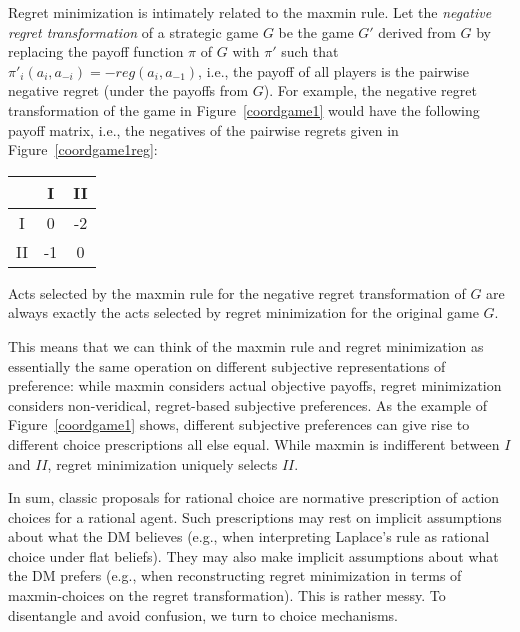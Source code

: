 \documentclass[fleqn,reqno,11pt]{article}
\begin{document}

  

Regret minimization is intimately related to the maxmin rule. Let the \emph{negative regret
  transformation} of a strategic game $G$ be the game $G'$ derived from $G$ by replacing the payoff
function $\pi$ of $G$ with $\pi'$ such that $\pi'_i(a_i, a_{-i}) = - reg(a_i,a_{-1})$, i.e.,
the payoff of all players is the pairwise negative regret (under the payoffs from $G$). For
example, the negative regret transformation of the game in Figure~\ref{coordgame1} would have the
following payoff matrix, i.e., the negatives of the pairwise regrets given in
Figure~\ref{coordgame1reg}:

\begin{center}
    \begin{tabular}{ccc}
      \toprule
      & I & II \\
      \midrule
      I & 0 & -2 \\
      II & -1 & 0\\
      \bottomrule
    \end{tabular}
\end{center}

\noindent Acts selected by the maxmin rule for the negative regret transformation of $G$ are
always exactly the acts selected by regret minimization for the original game $G$.

This means that we can think of the maxmin rule and regret minimization as essentially the same
operation on different subjective representations of preference: while maxmin considers actual
objective payoffs, regret minimization considers non-veridical, regret-based subjective
preferences. As the example of Figure~\ref{coordgame1} shows, different subjective preferences
can give rise to different choice prescriptions all else equal. While maxmin is indifferent
between $I$ and $II$, regret minimization uniquely selects $II$.

In sum, classic proposals for rational choice are normative prescription of action choices
for a rational agent. Such prescriptions may rest on implicit assumptions about what the DM
believes (e.g., when interpreting Laplace's rule as rational choice under flat beliefs). They may
also make implicit assumptions about what the DM prefers (e.g., when reconstructing regret
minimization in terms of maxmin-choices on the regret transformation). This is rather messy. To
disentangle and avoid confusion, we turn to choice mechanisms.
\end{document}
